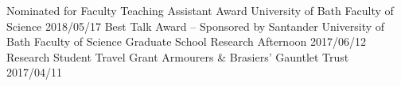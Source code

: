 \begin{cvpubs}
  \cvpub
    {Nominated for Faculty Teaching Assistant Award}
    {University of Bath Faculty of Science}
    {2018/05/17}
  \cvpub
    {Best Talk Award -- Sponsored by Santander}
    {University of Bath Faculty of Science Graduate School Research Afternoon}
    {2017/06/12}
  \cvpub
  	{Research Student Travel Grant}
    {Armourers \& Brasiers' Gauntlet Trust}
    {2017/04/11}
\end{cvpubs}



